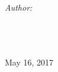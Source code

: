 \documentclass[
11pt, %
oneside, %
english, %
singlespacing, %
headsepline, %
chapterinoneline, %
]{MastersDoctoralThesis} %
\author{Lakshman Kumar K N} %
\begin{document}
\frontmatter %

\pagestyle{plain} %


\begin{titlepage}
\begin{center}

\vspace*{.06\textheight}
{\scshape\LARGE \univname\par}\vspace{1.5cm} %
\textsc{\Large \subjectname}\\[0.5cm] %

\HRule \\[0.4cm] %
{\huge \bfseries \ttitle\par}\vspace{0.4cm} %
\HRule \\[1.5cm] %
 
\begin{minipage}[t]{0.4\textwidth}
\end{minipage}
\begin{minipage}[t]{0.4\textwidth}

\end{minipage}\\[3cm]
 
\vfill

 \large
\emph{Author:}\\
\authorname
\\[0.3cm] %
\degreename\\\deptname\\[2cm] %
 
\vfill

{\large May 16, 2017}\\[1cm] %
 
\vfill
\end{center}
\end{titlepage}

\end{document}
